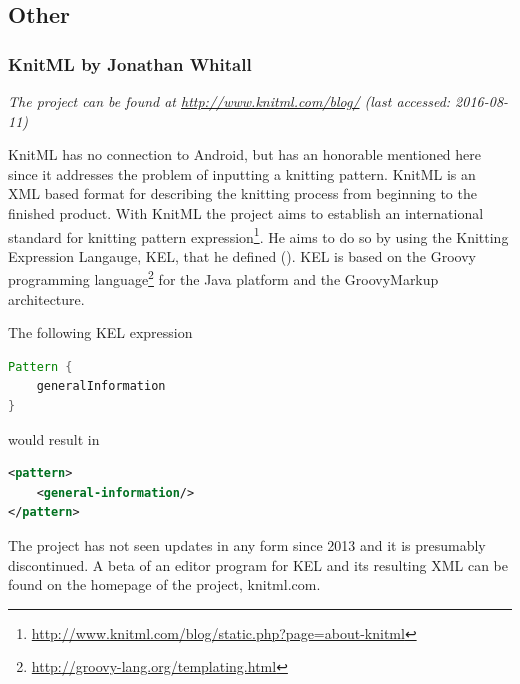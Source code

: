 \subsection{Other}

\subsubsection*{KnitML by Jonathan Whitall}

\textit{The project can be found at \url{http://www.knitml.com/blog/} \small{(last accessed: 2016-08-11)}}
\vspace*{0.5cm}

\noindent KnitML has no connection to Android, but has an honorable mentioned here since it addresses the problem of inputting a knitting pattern. KnitML is an XML based format for describing the knitting process from beginning to the finished product. With KnitML the project aims to establish an international standard for knitting pattern expression\footnote{\url{http://www.knitml.com/blog/static.php?page=about-knitml}}. He aims to do so by using the Knitting Expression Langauge, KEL, that he defined (\cite{knitml}). KEL is based on the Groovy programming language\footnote{\url{http://groovy-lang.org/templating.html}} for the Java platform and the GroovyMarkup architecture.

The following KEL expression

\begin{lstlisting}[language=Java, caption=Example expression in KnitML]
Pattern {
    generalInformation
}
\end{lstlisting}

would result in

\begin{lstlisting}[language=XML, caption=Example expression in KnitM: XML result]
<pattern>
    <general-information/>
</pattern>
\end{lstlisting}

The project has not seen updates in any form since 2013 and it is presumably discontinued. A beta of an editor program for KEL and its resulting XML can be found on the homepage of the project, knitml.com.